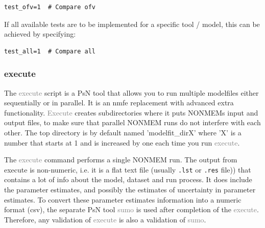 \documentclass[a4,11pt]{report} \usepackage[pdftex]{graphicx}
\newcommand{\psn}[1]{\textcolor{Grey}{#1}}
\begin{document}
\begin{lstlisting}
test_ofv=1  # Compare ofv
\end{lstlisting}

If all available tests are to be implemented for a specific tool /
model, this can be achieved by specifying:

\begin{lstlisting}
test_all=1  # Compare all
\end{lstlisting}

\subsubsection{execute}
The \psn{execute} script is a PsN tool that allows you to run multiple
modelfiles either sequentially or in parallel. It is an nmfe
replacement with advanced extra functionality. \psn{Execute} creates
subdirectories where it puts NONMEMs input and output files, to make
sure that parallel NONMEM runs do not interfere with each other. The
top directory is by default named 'modelfit\_dirX' where 'X' is a
number that starts at 1 and is increased by one each time you run
\psn{execute}.

\vspace{10pt}

\noindent The \psn{execute} command performs a single NONMEM run. The
output from execute is non-numeric, i.e. it is a flat text file
(usually {\tt .lst} or {\tt .res} file)) that contains a lot of info
about the model, dataset and run process. It does include the
parameter estimates, and possibly the estimates of uncertainty in
parameter estimates. To convert these parameter estimates information
into a numeric format (csv), the separate PsN tool \psn{sumo} is used
after completion of the \psn{execute}. Therefore, any validation of
\psn{execute} is also a validation of \psn{sumo}.
\end{document}
